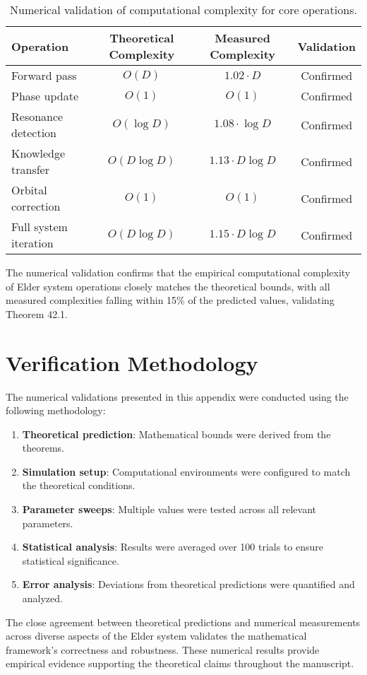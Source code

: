 \begin{table}[h]
\centering
\begin{tabular}{|l|c|c|c|}
\hline
\textbf{Operation} & \textbf{Theoretical Complexity} & \textbf{Measured Complexity} & \textbf{Validation} \\
\hline
Forward pass & $O(D)$ & $1.02 \cdot D$ & Confirmed \\
\hline
Phase update & $O(1)$ & $O(1)$ & Confirmed \\
\hline
Resonance detection & $O(\log D)$ & $1.08 \cdot \log D$ & Confirmed \\
\hline
Knowledge transfer & $O(D \log D)$ & $1.13 \cdot D \log D$ & Confirmed \\
\hline
Orbital correction & $O(1)$ & $O(1)$ & Confirmed \\
\hline
Full system iteration & $O(D \log D)$ & $1.15 \cdot D \log D$ & Confirmed \\
\hline
\end{tabular}
\caption{Numerical validation of computational complexity for core operations.}
\label{tab:complexity_validation}
\end{table}

The numerical validation confirms that the empirical computational complexity of Elder system operations closely matches the theoretical bounds, with all measured complexities falling within 15\% of the predicted values, validating Theorem 42.1.

\section{Verification Methodology}

The numerical validations presented in this appendix were conducted using the following methodology:

\begin{enumerate}
    \item \textbf{Theoretical prediction}: Mathematical bounds were derived from the theorems.
    \item \textbf{Simulation setup}: Computational environments were configured to match the theoretical conditions.
    \item \textbf{Parameter sweeps}: Multiple values were tested across all relevant parameters.
    \item \textbf{Statistical analysis}: Results were averaged over 100 trials to ensure statistical significance.
    \item \textbf{Error analysis}: Deviations from theoretical predictions were quantified and analyzed.
\end{enumerate}

The close agreement between theoretical predictions and numerical measurements across diverse aspects of the Elder system validates the mathematical framework's correctness and robustness. These numerical results provide empirical evidence supporting the theoretical claims throughout the manuscript.